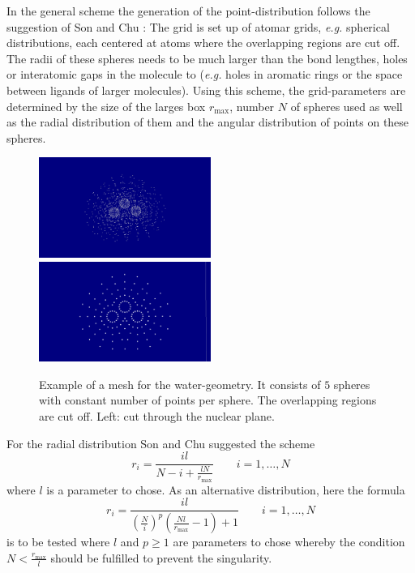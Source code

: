 In the general scheme the generation of the point-distribution follows the suggestion of Son and Chu \cite{Son_Chu}:
The grid is set up of atomar grids, \textit{e.g.} spherical distributions, each centered at atoms where the overlapping regions are cut off.
The radii of these spheres needs to be much larger than the bond lengthes, holes or interatomic gaps in the molecule to (\textit{e.g.} holes in aromatic rings or the space between ligands of larger molecules).
Using this scheme, the grid-parameters are determined by the size of the larges box $r_\text{max}$, number $N$ of spheres used as well as the radial distribution of them and the angular distribution of points on these spheres.
\begin{figure}
   \includegraphics[width=0.5\textwidth]{water1}
   \includegraphics[width=0.5\textwidth]{water2}
   \caption{Example of a mesh for the water-geometry. It consists of $5$ spheres with constant number of points per sphere. The overlapping regions are cut off. Left: cut through the nuclear plane.}
   \label{fig:molmesh}
\end{figure}

For the radial distribution Son and Chu \cite{Son_Chu0} suggested the scheme
\begin{equation}
r_i=\frac{il}{N-i+\frac{lN}{r_\text{max}}} \qquad i=1,\hdots ,N 
\end{equation}
where $l$ is a parameter to chose.
As an alternative distribution, here the formula
\begin{equation}
r_i=\frac{il}{\left( \frac Ni \right)^p \left(\frac{Nl}{r_\text{max}}-1\right) +1} \qquad i=1,\hdots ,N 
\end{equation}
is to be tested where $l$ and $p\geq 1$ are parameters to chose whereby the condition $N<\frac{r_\text{max}}{l}$ should be fulfilled to prevent the singularity.

